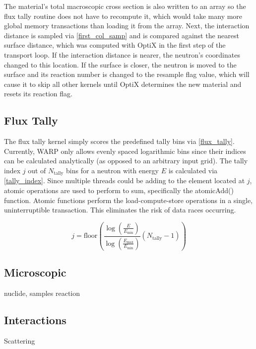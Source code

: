 The material's total macroscopic cross section is also written to an array so the flux tally routine does not have to recompute it, which would take many more global memory transactions than loading it from the array.  Next, the interaction distance is sampled via \eqref{first_col_samp} and is compared against the nearest surface distance, which was computed with OptiX in the first step of the transport loop.  If the interaction distance is nearer, the neutron's coordinates changed to this location.  If the surface is closer, the neutron is moved to the surface and its reaction number is changed to the resample flag value, which will cause it to skip all other kernels until OptiX determines the new material and resets its reaction flag.

\subsection{Flux Tally}

The flux tally kernel simply scores the predefined tally bins via \eqref{flux_tally}.  Currently, WARP only allows evenly spaced logarithmic bins since their indices can be calculated analytically (as opposed to an arbitrary input grid).  The tally index $j$ out of $N_\mathrm{tally}$ bins for a neutron with energy $E$ is calculated via \eqref{tally_index}.  Since multiple threads could be adding to the element located at $j$, atomic operations are used to perform to sum, specifically the atomicAdd() function.  Atomic functions perform the load-compute-store operations in a single, uninterruptible transaction.  This eliminates the risk of data races occurring.

\begin{equation}
j = \mathrm{floor} \left( \frac{ \log \left( \frac{E}{E_\mathrm{min}} \right)} { \log \left( \frac{E_\mathrm{max}}{E_\mathrm{min}} \right)} (N_\mathrm{tally}-1) \right)
\label{tally_index}
\end{equation}

\subsection{Microscopic}

nuclide, samples reaction

\subsection{Interactions}

Scattering

